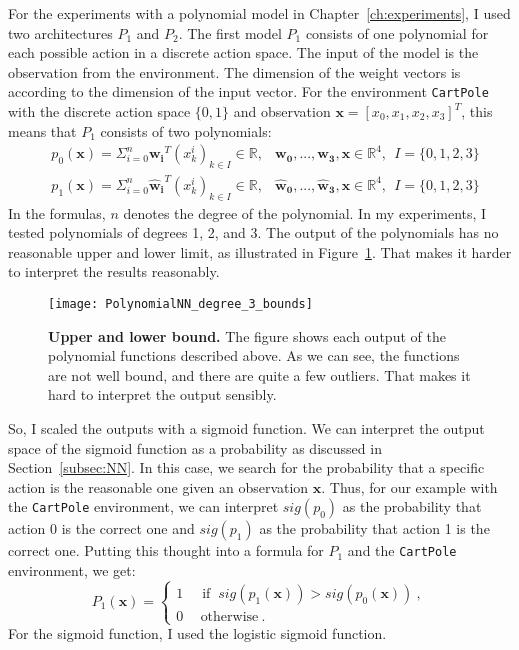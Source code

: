 For the experiments with a polynomial model in Chapter~\ref{ch:experiments}, I used two architectures $P_1$ and $P_2$. The first model $P_1$ consists of one polynomial for each possible action in a discrete action space. The input of the model is the observation from the environment. The dimension of the weight vectors is according to the dimension of the input vector. For the environment \verb|CartPole| with the discrete action space $\{0, 1\}$ and observation $\mathbf{x} = [x_0, x_1, x_2, x_3]^T$, this means that $P_1$ consists of two polynomials:
\begin{align*}
  &p_0(\mathbf{x}) = \Sigma_{i=0}^{n} \mathbf{w_i}^T (x_k^i)_{k \in I} \in \mathbb{R}, &\mathbf{w_0}, ..., \mathbf{w_3}, \mathbf{x} \in \mathbb{R}^4, \ \ I = \{0, 1, 2, 3\} \\
  &p_1(\mathbf{x}) = \Sigma_{i=0}^{n} \mathbf{\hat{w}_i}^T (x_k^i)_{k \in I} \in \mathbb{R}, &\mathbf{\hat{w}_0}, ..., \mathbf{\hat{w}_3}, \mathbf{x} \in \mathbb{R}^4, \ \ I = \{0, 1, 2, 3\}
\end{align*}
In the formulas, $n$ denotes the degree of the polynomial. In my experiments, I tested polynomials of degrees 1, 2, and 3. The output of the polynomials has no reasonable upper and lower limit, as illustrated in Figure~\ref{fig:bounds}. That makes it harder to interpret the results reasonably.
\begin{figure}[ht]
\centering
\texttt{[image: PolynomialNN\_degree\_3\_bounds]}
\caption[Upper and lower bound]{
  \textbf{Upper and lower bound.}
  The figure shows each output of the polynomial functions described above. As we can see, the functions are not well bound, and there are quite a few outliers. That makes it hard to interpret the output sensibly.
}
\label{fig:bounds}
\end{figure}
So, I scaled the outputs with a sigmoid function. We can interpret the output space of the sigmoid function as a probability as discussed in Section~\ref{subsec:NN}. In this case, we search for the probability that a specific action is the reasonable one given an observation $\mathbf{x}$. Thus, for our example with the \verb|CartPole| environment, we can interpret $sig(p_0)$ as the probability that action 0 is the correct one and $sig(p_1)$ as the probability that action 1 is the correct one. Putting this thought into a formula for $P_1$ and the \verb|CartPole| environment, we get:
\[
  P_1(\mathbf{x}) =
  \begin{cases}1~&{\text{ if }}~sig(p_1(\mathbf{x})) > sig(p_0(\mathbf{x}))~,\\0~&~\text{otherwise}~.\end{cases}
\]
For the sigmoid function, I used the logistic sigmoid function.

